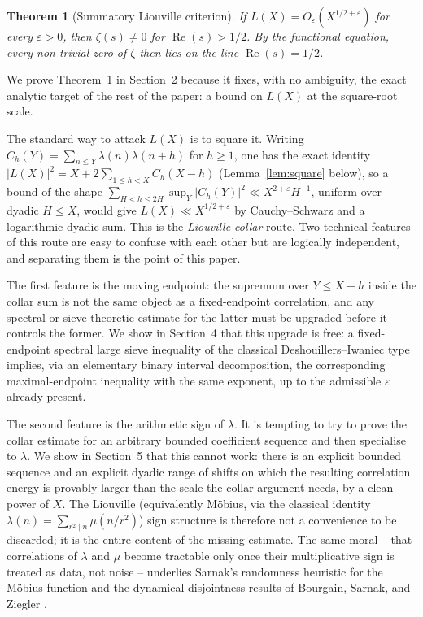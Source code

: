 \documentclass[11pt]{article}
\newtheorem{theorem}{Theorem}[section]
\begin{document}
\begin{theorem}[Summatory Liouville criterion]
\label{thm:criterion}
If $L(X)=O_\varepsilon(X^{1/2+\varepsilon})$ for every $\varepsilon>0$, then $\zeta(s)\neq0$ for
$\operatorname{Re}(s)>1/2$. By the functional equation, every non-trivial zero of $\zeta$ then lies on
the line $\operatorname{Re}(s)=1/2$.
\end{theorem}

We prove Theorem~\ref{thm:criterion} in Section~2 because it fixes, with no ambiguity, the exact
analytic target of the rest of the paper: a bound on $L(X)$ at the square-root scale.

The standard way to attack $L(X)$ is to square it. Writing $C_h(Y)=\sum_{n\le Y}\lambda(n)\lambda(n+h)$
for $h\ge1$, one has the exact identity $|L(X)|^2=X+2\sum_{1\le h<X}C_h(X-h)$ (Lemma~\ref{lem:square}
below), so a bound of the shape $\sum_{H<h\le 2H}\sup_Y|C_h(Y)|^2\ll X^{2+\varepsilon}H^{-1}$, uniform over
dyadic $H\le X$, would give $L(X)\ll X^{1/2+\varepsilon}$ by Cauchy--Schwarz and a logarithmic dyadic sum.
This is the \emph{Liouville collar} route. Two technical features of this route are easy to confuse with
each other but are logically independent, and separating them is the point of this paper.

The first feature is the moving endpoint: the supremum over $Y\le X-h$ inside the collar sum is not the
same object as a fixed-endpoint correlation, and any spectral or sieve-theoretic estimate for the latter
must be upgraded before it controls the former. We show in Section~4 that this upgrade is free: a
fixed-endpoint spectral large sieve inequality of the classical Deshouillers--Iwaniec type
\cite{deshouillers-iwaniec} implies, via an elementary binary interval decomposition, the corresponding
maximal-endpoint inequality with the same exponent, up to the admissible $\varepsilon$ already present.

The second feature is the arithmetic sign of $\lambda$. It is tempting to try to prove the collar
estimate for an arbitrary bounded coefficient sequence and then specialise to $\lambda$. We show in
Section~5 that this cannot work: there is an explicit bounded sequence and an explicit dyadic range of
shifts on which the resulting correlation energy is provably larger than the scale the collar argument
needs, by a clean power of $X$. The Liouville (equivalently M\"obius, via the classical identity
$\lambda(n)=\sum_{r^2\mid n}\mu(n/r^2)$) sign structure is therefore not a convenience to be discarded; it
is the entire content of the missing estimate. The same moral -- that correlations of $\lambda$ and $\mu$
become tractable only once their multiplicative sign is treated as data, not noise -- underlies Sarnak's
randomness heuristic for the M\"obius function \cite{sarnak-letter} and the dynamical disjointness results
of Bourgain, Sarnak, and Ziegler \cite{bourgain-sarnak-ziegler}.
\end{document}
